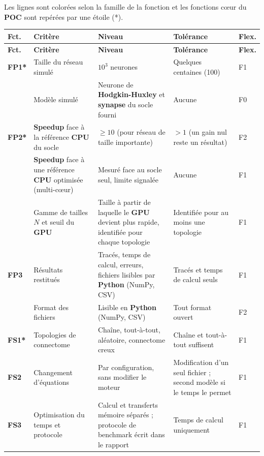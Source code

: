 Les lignes sont colorées selon la famille de la fonction et les fonctions cœur du \textbf{POC} sont repérées par une étoile (*).

{\small
\setlength{\tabcolsep}{3.5pt}
\begin{longtable}{|p{1.0cm}|p{4.6cm}|p{4.3cm}|p{3.4cm}|p{0.8cm}|}
\hline
\rowcolor{gray!15}
\textbf{Fct.} & \textbf{Critère} & \textbf{Niveau} & \textbf{Tolérance} & \textbf{Flex.} \\ \hline
\endfirsthead
\hline
\rowcolor{gray!15}
\textbf{Fct.} & \textbf{Critère} & \textbf{Niveau} & \textbf{Tolérance} & \textbf{Flex.} \\ \hline
\endhead

\rowcolor{whybg} \textbf{FP1*} & Taille du réseau simulé & $10^3$ neurones & Quelques centaines (100) & F1 \\ \hline
\rowcolor{whybg} & Modèle simulé & Neurone de \textbf{Hodgkin-Huxley} et \textbf{synapse} du socle fourni & Aucune & F0 \\ \hline
\rowcolor{whybg} \textbf{FP2*} & \textbf{Speedup} face à la référence \textbf{CPU} du socle & $\geq 10$ (pour réseau de taille importante) & $> 1$ (un gain nul reste un résultat) & F2 \\ \hline
\rowcolor{whybg} & \textbf{Speedup} face à une référence \textbf{CPU} optimisée (multi-cœur) & Mesuré face au socle seul, limite signalée & Aucune & F1 \\ \hline
\rowcolor{whybg} & Gamme de tailles $N$ et seuil du \textbf{GPU} & Taille à partir de laquelle le \textbf{GPU} devient plus rapide, identifiée pour chaque topologie & Identifiée pour au moins une topologie & F1 \\ \hline
\rowcolor{whybg} \textbf{FP3} & Résultats restitués & Tracés, temps de calcul, erreurs, fichiers lisibles par \textbf{Python} (NumPy, CSV) & Tracés et temps de calcul seuls & F1 \\ \hline
\rowcolor{whybg} & Format des fichiers & Lisible en \textbf{Python} (NumPy, CSV) & Tout format ouvert & F2 \\ \hline
\rowcolor{whatbg} \textbf{FS1*} & Topologies de connectome & Chaîne, tout-à-tout, aléatoire, connectome creux & Chaîne et tout-à-tout suffisent & F1 \\ \hline
\rowcolor{whatbg} \textbf{FS2} & Changement d'équations & Par configuration, sans modifier le moteur & Modification d'un seul fichier ; second modèle si le temps le permet & F1 \\ \hline
\rowcolor{whatbg} \textbf{FS3} & Optimisation du temps et protocole & Calcul et transferts mémoire séparés ; protocole de benchmark écrit dans le rapport & Temps de calcul uniquement & F1 \\ \hline

\end{longtable}}
